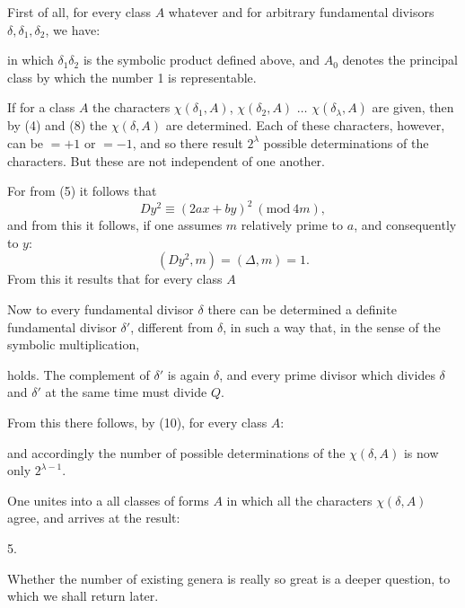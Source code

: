 
First of all, for every class $A$ whatever and for arbitrary
fundamental divisors $\delta, \delta_1, \delta_2$, we have:


in which $\delta_1\delta_2$ is the symbolic product defined above, and $A_0$
denotes the principal class by which the number 1 is representable.

If for a class $A$ the characters $\chi(\delta_1, A)$, $\chi(\delta_2, A)$ $\dots$
$\chi(\delta_\lambda, A)$ are given, then by (4) and (8)  the $\chi(\delta, A)$ are determined.
Each of these characters, however, can be $= +1$ or $= -1$,
and so there result $2^\lambda$ possible determinations of the characters.
But these are not independent of one another.

For from (5) it follows that
\[
Dy^2 \equiv (2ax + by)^2 \ (\mathrm{mod}\ 4m),
\]
and from this it follows, if one assumes $m$ relatively prime to $a$, and consequently to $y$: %
\[
(Dy^2, m) = (\Delta, m) = 1.
\]
From this it results that for every class $A$


Now to every fundamental divisor $\delta$ there can be determined a definite
 fundamental divisor $\delta'$, different from $\delta$, in such a way
that, in the sense of the symbolic multiplication,


holds. The complement of $\delta'$ is again $\delta$, and every prime divisor
which divides $\delta$ and $\delta'$ at the same time must divide $Q$.

From this there follows, by (10), for every class $A$:


and accordingly the number of possible determinations of
the $\chi(\delta, A)$ is now only $2^{\lambda-1}$.

One unites into a  all classes of forms $A$ in which all the characters $\chi(\delta, A)$ agree,
and arrives at the result:

5. 

Whether the number of existing genera is really so
great is a deeper question, to which we shall return later.
